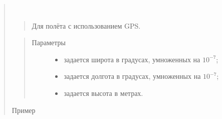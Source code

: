 \documentclass[a4paper,10pt,russian]{sphinxmanual}
\begin{document}
\begin{quote}
\begin{fulllineitems}
\begin{quote}
\begin{description}
\end{description}\end{quote}

\end{fulllineitems}



%
\begin{sphinxVerbatim}[commandchars=\\\{\}]
\end{sphinxVerbatim}

\begin{fulllineitems}
\label{\detokenize{programming/lua/lua:ap.goToPoint}}~\begin{quote}

Для полёта с использованием GPS.
\end{quote}
\begin{quote}\begin{description}
\item[{Параметры}] \leavevmode\begin{itemize}
\item {} 
 \textendash{} задается широта в градусах, умноженных на \(10^{-7}\);

\item {} 
 \textendash{} задается долгота в градусах, умноженных на \(10^{-7}\);

\item {} 
 \textendash{} задается высота в метрах.

\end{itemize}

\end{description}\end{quote}

Пример 

\end{fulllineitems}



\end{quote}
\end{document}
